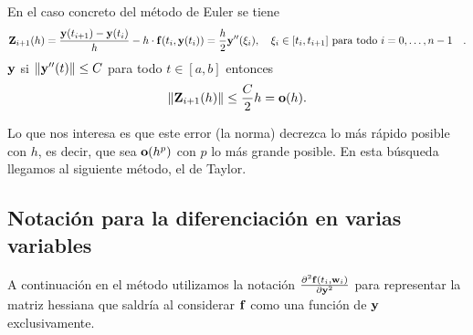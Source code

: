 

\begin{example}
    En el caso concreto del método de Euler se tiene
    \begin{equation*}
        \ELT_{i+1}(h) =
        \frac{\vy(t_{i+1}) - \vy(t_i)}{h} - h\cdot \vf(t_i,\vy(t_i)) =
        \frac{h}{2} \vy''(\xi_i),
            \qq{$\xi_i \in [t_i, t_{i+1}]$ para todo $i=0,\dots, n-1$}.
    \end{equation*}
    $\vb{y}$ si $\norm{\vb{y}''(t)} \le C$ para todo $t \in [a, b]$ entonces
    \begin{equation*}
        \norm{\vb{Z}_{i+1}(h)} \le \frac{C}{2}h = \vb{o}(h).
    \end{equation*}

    Lo que nos interesa es que este error (la norma)
    decrezca lo más rápido posible con $h$,
    es decir, que sea $\vb{o}(h^p)$ con $p$ lo más grande posible.
    En esta búsqueda llegamos al siguiente método, el de Taylor.
\end{example}

\subsection{Notación para la diferenciación en varias variables}

A continuación en el método utilizamos la notación
$\pdv[2]{\vb{f}(t_i, \vb{w}_i)}{\vb{y}}$
para representar la matriz hessiana que saldría al considerar $\vb{f}$
como una función de $\vb{y}$ exclusivamente.

